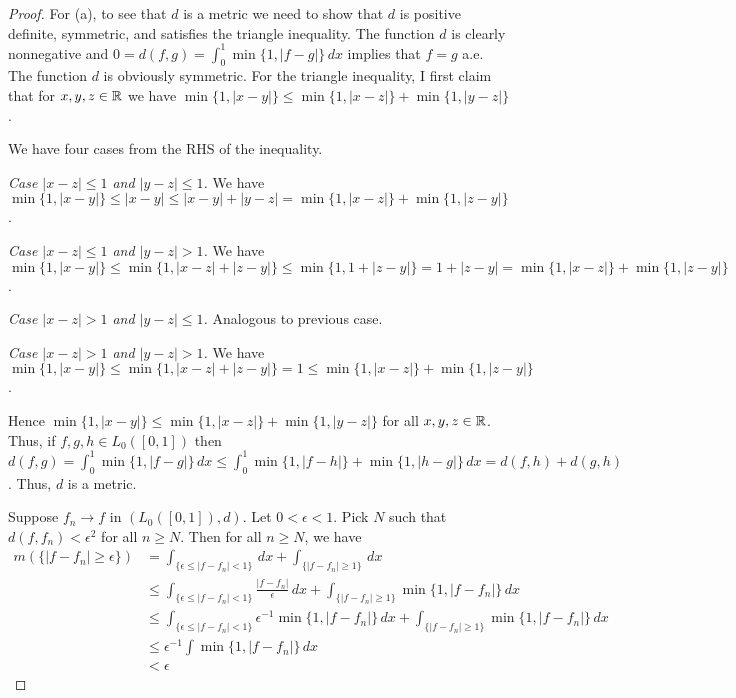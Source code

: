 \documentclass{article}
\begin{document}
\begin{proof}
For (a), to see that $d$ is a metric we need to show that $d$ is positive definite, symmetric, and satisfies the triangle inequality.  The function $d$ is clearly nonnegative and $0 = d(f,g) = \int_0^1 \min\{1, |f - g|\} \, dx$ implies that $f = g$ a.e.  The function $d$ is obviously symmetric.  For the triangle inequality, I first claim that for $x,y,z \in \mathbb{R}$ we have  $\min\{1, |x - y|\} \le \min\{1, |x - z| \} + \min\{1, |y-z|\}$. 

We have four cases from the RHS of the inequality. 

\emph{Case $|x - z| \le 1$ and $|y - z| \le 1$.}  We have $\min\{1, |x - y|\}  \le |x - y| \le |x - y| + |y - z| = \min\{1, |x - z|\}  + \min\{1, |z - y|\}$.

\emph{Case $|x - z| \le 1$ and $|y - z| > 1$.} We have $\min\{1, |x - y|\} \le \min\{1, |x - z| + |z- y|\} \le \min\{1, 1 + |z- y|\} = 1 + |z- y| = \min\{1, |x - z|\}  + \min\{1, |z - y|\}$.

\emph{Case $|x - z| > 1$ and $|y - z| \le 1$.} Analogous to previous case.

\emph{Case $|x - z| > 1$ and $|y - z| > 1$.} We have $\min\{1, |x - y|\} \le \min\{1, |x - z| + |z- y|\} = 1 \le \min\{1, |x - z|\}  + \min\{1, |z - y|\}$.

Hence $\min\{1, |x - y|\} \le \min\{1, |x - z| \} + \min\{1, |y-z|\}$ for all $x,y,z \in \mathbb{R}$.  Thus, if $f,g,h \in L_0([0,1])$ then 
$d(f,g) = \int_0^1 \min\{1, |f - g|\} \, dx \le \int_0^1 \min\{1, |f - h|\} + \min\{1, |h - g|\}  \, dx =  d(f,h) + d(g,h)$.  Thus, $d$ is a metric.

Suppose $f_n \to f$ in $(L_0([0,1]), d)$.  Let $0 < \epsilon < 1$.  Pick $N$ such that $d(f, f_n) < \epsilon^2$ for all $n \ge N$.  Then for all $n \ge N$,
we have 
\begin{align*}
m(\{ |f - f_n| \ge \epsilon \})  & = \int_{\{ \epsilon \le |f - f_n| < 1 \}} \,dx + \int_{\{ |f - f_n| \ge 1 \}} \, dx
\\ & \le \int_{\{ \epsilon \le |f - f_n| < 1 \}} \frac { |f - f_n|} {\epsilon} \,dx + \int_{\{ |f - f_n| \ge 1 \}} \min\{1, |f - f_n|\} \, dx
\\ & \le \int_{\{ \epsilon \le |f - f_n| < 1 \}} \epsilon^{-1}  \min\{1, |f - f_n|\}  \,dx + \int_{\{ |f - f_n| \ge 1 \}} \min\{1, |f - f_n|\} \, dx
\\ & \le \epsilon^{-1} \int \min\{1, |f - f_n|\} \, dx
\\ & < \epsilon
\end{align*}


\end{proof}
\end{document}
